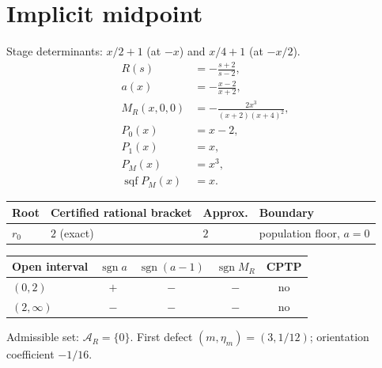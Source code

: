 \documentclass[11pt]{article}
\begin{document}
\section{Implicit midpoint}
Stage determinants: $x / 2 + 1$ (at $-x$) and $x / 4 + 1$ (at $-x/2$).
\begin{align*}
R(s)&=- \frac{s + 2}{s - 2},\\
a(x)&=- \frac{x - 2}{x + 2},\\
M_R(x,0,0)&=- \frac{2 x^{3}}{\left(x + 2\right) \left(x + 4\right)^{2}},\\
P_0(x)&=x-2,\\
P_1(x)&=x,\\
P_M(x)&=x^{3},\\
\operatorname{sqf}P_M(x)&=x.
\end{align*}
\begin{center}
\begin{tabular}{@{}llll@{}}
\toprule
Root & Certified rational bracket & Approx. & Boundary \\
\midrule
$r_0$ & $2$ (exact) & $2$ & population floor, $a=0$ \\
\bottomrule
\end{tabular}
\end{center}
\begin{center}
\begin{tabular}{@{}lcccc@{}}
\toprule
Open interval & $\operatorname{sgn}a$ & $\operatorname{sgn}(a-1)$ & $\operatorname{sgn}M_R$ & CPTP \\
\midrule
$(0,2)$ & $+$ & $-$ & $-$ & no \\
$(2,\infty)$ & $-$ & $-$ & $-$ & no \\
\bottomrule
\end{tabular}
\end{center}
Admissible set: $\mathcal A_R=\{0\}$. First defect $(m,\eta_m)=(3,1/12)$; orientation coefficient $-1/16$.
\end{document}
